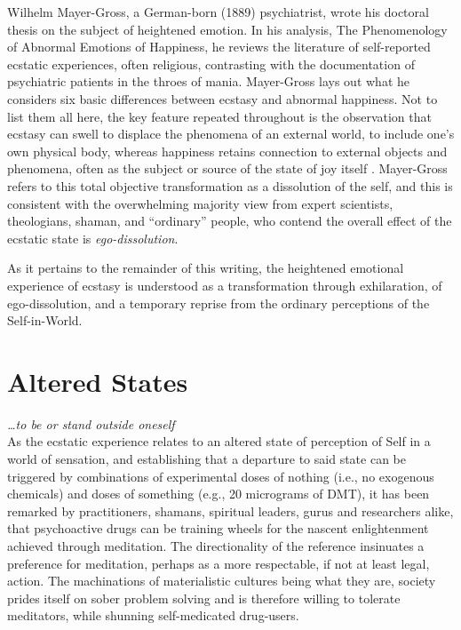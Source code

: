 \documentclass{UIdahoMastersThesis}
\begin{document}
Wilhelm Mayer-Gross, a German-born (1889) psychiatrist, wrote his doctoral thesis on the subject of heightened emotion. In his analysis, The Phenomenology of Abnormal Emotions of Happiness, he reviews the literature of self-reported ecstatic experiences, often religious, contrasting with the documentation of psychiatric patients in the throes of mania\cite{mayer-gross_translation:_nodate}.  Mayer-Gross lays out what he considers six basic differences between ecstasy and abnormal happiness. Not to list them all here, the key feature repeated throughout is the observation that ecstasy can swell to displace the phenomena of an external world, to include one's own physical body, whereas happiness retains connection to external objects and phenomena, often as the subject or source of the state of joy itself \cite{beer_nature_2000} . Mayer-Gross refers to this total objective transformation as a dissolution of the self, and this is consistent with the overwhelming majority view from expert scientists, theologians, shaman, and ``ordinary'' people, who contend the overall effect of the ecstatic state is \emph{ego-dissolution}.

As it pertains to the remainder of this writing, the heightened emotional experience of ecstasy is understood as a transformation through exhilaration, of ego-dissolution, and a temporary reprise from the ordinary perceptions of the Self-in-World.

\section{Altered States}

\emph{\ldots to be or stand outside oneself}\\

As the ecstatic experience relates to an altered state of perception of Self in a world of sensation, and establishing that a departure to said state can be triggered by combinations of experimental doses of nothing (i.e., no exogenous chemicals) and doses of something (e.g., 20 micrograms of DMT), it has been remarked by practitioners, shamans, spiritual leaders, gurus and researchers alike, that psychoactive drugs can be training wheels for the nascent enlightenment achieved through meditation. The directionality of the reference insinuates a preference for meditation, perhaps as a more respectable, if not at least legal, action. The machinations of materialistic cultures being what they are, society prides itself on sober problem solving and is therefore willing to tolerate meditators, while shunning self-medicated drug-users.
\end{document}
